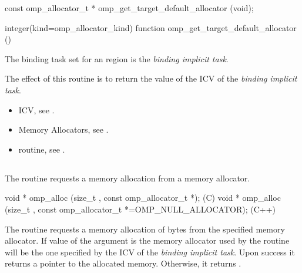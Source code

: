 \format
\ccppspecificstart
\begin{boxedcode}
const omp_allocator_t * omp_get_target_default_allocator (void);
\end{boxedcode}
\ccppspecificend
\fortranspecificstart
\begin{boxedcode}
integer(kind=omp_allocator_kind) 
function omp_get_target_default_allocator ()
\end{boxedcode}
\fortranspecificend

\binding

The binding task set for an  region is the \emph{binding implicit task}.

\effect

The effect of this routine is to return the value of the  ICV of the \emph{binding implicit task}.

\crossreferences
\begin{itemize}
\item {} ICV, see .
\item Memory Allocators, see .
\item {} routine, see .
\end{itemize}

\ccppspecificstart


\subsection{}
\label{subsec:omp_alloc}

\summary
The  routine requests a memory allocation from a memory allocator.

\format
\begin{boxedcode}
void * omp_alloc (size_t , const omp_allocator_t *);  (C)
void * omp_alloc (size_t , 
           const omp_allocator_t *=OMP_NULL_ALLOCATOR); (C++)
\end{boxedcode}

\effect

The  routine requests a memory allocation of  bytes from the specified memory allocator. If value of the  argument is 
 the memory allocator used by the routine will be the one specified by the  ICV of the \emph{binding implicit task}.
Upon success it returns a pointer to the allocated memory. Otherwise, it returns .

